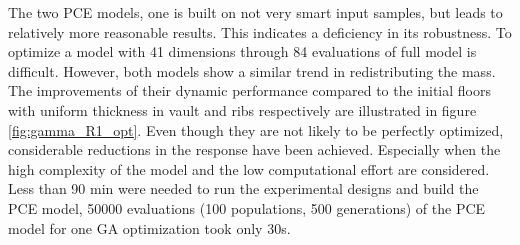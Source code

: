 The two PCE models, one is built on not very smart input samples, but leads to relatively more reasonable results. This indicates a deficiency in its robustness. To optimize a model with 41 dimensions through 84 evaluations of full model is difficult. However, both models show a similar trend in redistributing the mass. The improvements of their dynamic performance compared to the initial floors with uniform thickness in vault and ribs respectively are illustrated in figure \ref{fig:gamma_R1_opt}. Even though they are not likely to be perfectly optimized, considerable reductions in the response have been achieved. Especially when the high complexity of the model and the low computational effort are considered. Less than 90 min were needed to run the experimental designs and build the PCE model, 50000 evaluations (100 populations, 500 generations) of the PCE model for one GA optimization took only 30s. 

